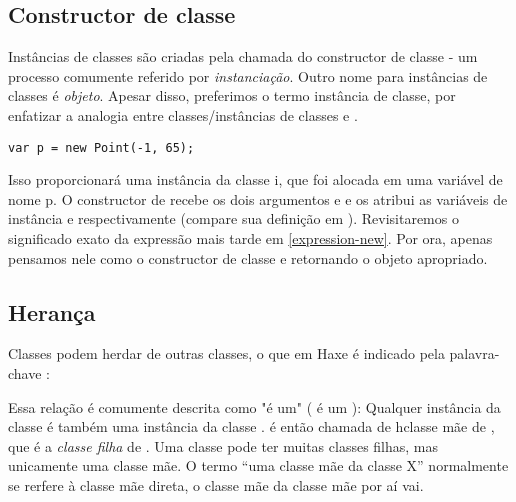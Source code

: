 
\subsection{Constructor de classe}
\label{types-class-constructor}

Instâncias de classes são criadas pela chamada do constructor de classe - um processo comumente referido por \emph{instanciação}. Outro nome para instâncias de classes é \emph{objeto}. Apesar disso, preferimos o termo instância de classe, por enfatizar a analogia entre classes/instâncias de classes e .

\begin{lstlisting}
var p = new Point(-1, 65);
\end{lstlisting}
Isso proporcionará uma instância da classe i, que foi alocada em uma variável de nome p. O constructor de  recebe os dois argumentos  e  e os atribui as variáveis de instância  e  respectivamente (compare sua definição em ). Revisitaremos o significado exato da expressão  mais tarde em \ref{expression-new}. Por ora, apenas pensamos nele como o constructor de classe e retornando o objeto apropriado.



\subsection{Herança}
\label{types-class-inheritance}

Classes podem herdar de outras classes, o que em Haxe é indicado pela palavra-chave :

Essa relação é comumente descrita como "é um" ( é um ): Qualquer instância da classe  é também uma instância da classe .  é então chamada de \emp
h{classe mãe} de , que é a  \emph{classe filha} de . Uma classe pode ter muitas classes filhas, mas unicamente uma classe mãe. O termo ``uma classe mãe da classe X'' normalmente se rerfere à classe mãe direta, o classe mãe da classe mãe por aí vai. 

